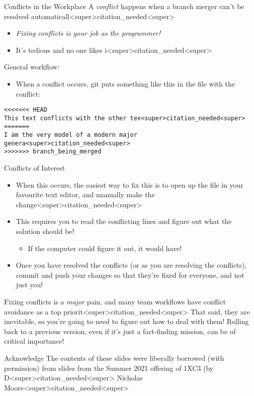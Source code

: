 \documentclass[11pt]{beamer}
\begin{document}
\begin{frame}[fragile=singleslide]{Conflicts in the Workplace}
A \textit{conflict} happens when a branch merger can't be resolved  automaticall<super>citation_needed<super>  
\begin{itemize}
\item \textit{Fixing conflicts is your job as the programmer!}
\item It's tedious and no one likes i<super>citation_needed<super>
\end{itemize}
General workflow:
\begin{itemize}
\item When a conflict occurs, git puts something like this in the file with the conflict:
\end{itemize}
\begin{lstlisting}
<<<<<<< HEAD
This text conflicts with the other tex<super>citation_needed<super>
=======
I am the very model of a modern major genera<super>citation_needed<super>
>>>>>>> branch_being_merged
\end{lstlisting}
\end{frame}

\begin{frame}{Conflicts of Interest}
\begin{itemize}
\item When this occurs, the easiest way to fix this is to open up the file in your favourite text editor, and manually make the change<super>citation_needed<super>
\item This requires you to read the conflicting lines and figure out what the solution should be! 
\begin{itemize}
\item If the computer could figure it out, it would have! 
\end{itemize}
\item Once you have resolved the conflicts (or as you are resolving the conflicts), commit and push your changes so that they're fixed for everyone, and not just you! 
\end{itemize}
Fixing conflicts is a \emph{major} pain, and many team workflows have conflict avoidance as a top priorit<super>citation_needed<super>  
That said, they are inevitable, so you're going to need to figure out how to deal with them!  Rolling back to a previous version, even if it's just a fact-finding mission, can be of critical importance!
\end{frame}


\begin{frame}{Acknowledge}
\center
\vspace{8em}
The contents of these slides were liberally borrowed (with permission) from slides from the Summer 2021 offering of 1XC3 (by D<super>citation_needed<super> Nicholas Moore<super>citation_needed<super>  
\end{frame}
\end{document}

